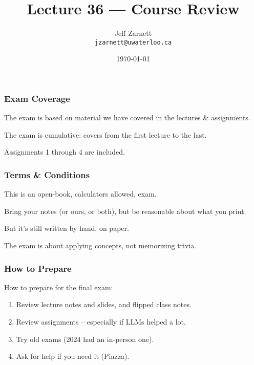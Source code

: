 

\title{Lecture 36 --- Course Review }

\author{Jeff Zarnett \\ \small \texttt{jzarnett@uwaterloo.ca}}
\date{\today}




\begin{frame}
  \titlepage

\end{frame}

\begin{frame}
\frametitle{Exam Coverage}

The exam is based on material we have covered in the lectures \& assignments.

The exam is cumulative: covers from the first lecture to the last.

Assignments 1 through 4 are included.

\end{frame}

\begin{frame}
\frametitle{Terms \& Conditions}

This is an open-book, calculators allowed, exam.


Bring your notes (or ours, or both), but be reasonable about what you print.

But it's still written by hand, on paper.

The exam is about applying concepts, not memorizing trivia.

\end{frame}

\begin{frame}
\frametitle{How to Prepare}

How to prepare for the final exam:

\begin{enumerate}
	\item Review lecture notes and slides, and flipped class notes.
	\item Review assignments -- especially if LLMs helped a lot.
	\item Try old exams (2024 had an in-person one).
	\item Ask for help if you need it (Piazza).
\end{enumerate}

\end{frame}

